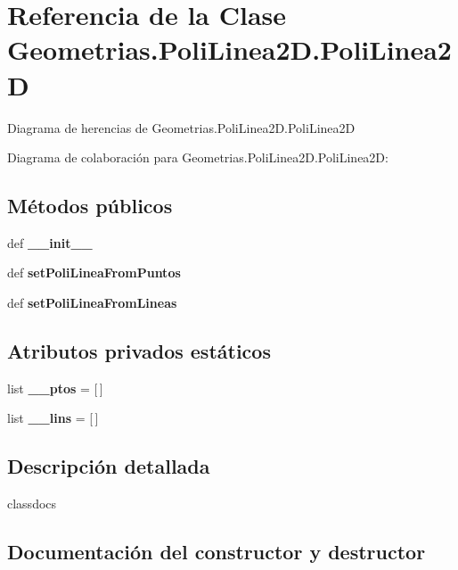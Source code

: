 \section{Referencia de la Clase Geometrias.\-Poli\-Linea2\-D.\-Poli\-Linea2\-D}
\label{classGeometrias_1_1PoliLinea2D_1_1PoliLinea2D}


Diagrama de herencias de Geometrias.\-Poli\-Linea2\-D.\-Poli\-Linea2\-D


Diagrama de colaboración para Geometrias.\-Poli\-Linea2\-D.\-Poli\-Linea2\-D\-:
\subsection*{Métodos públicos}
\begin{DoxyCompactItemize}
\item 
def {\bf \-\_\-\-\_\-init\-\_\-\-\_\-}
\item 
def {\bf set\-Poli\-Linea\-From\-Puntos}
\item 
def {\bf set\-Poli\-Linea\-From\-Lineas}
\end{DoxyCompactItemize}
\subsection*{Atributos privados estáticos}
\begin{DoxyCompactItemize}
\item 
list {\bf \-\_\-\-\_\-ptos} = [$\,$]
\item 
list {\bf \-\_\-\-\_\-lins} = [$\,$]
\end{DoxyCompactItemize}


\subsection{Descripción detallada}
\begin{DoxyVerb}classdocs
\end{DoxyVerb}
 

\subsection{Documentación del constructor y destructor}
